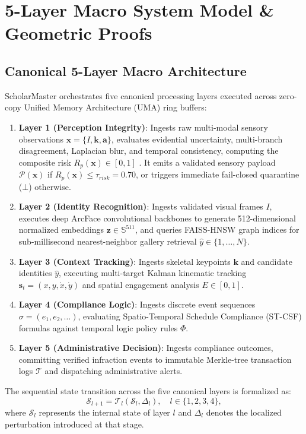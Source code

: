\documentclass[conference]{IEEEtran}
\begin{document}
\section{5-Layer Macro System Model \& Geometric Proofs}
\subsection{Canonical 5-Layer Macro Architecture}
ScholarMaster orchestrates five canonical processing layers executed across zero-copy Unified Memory Architecture (UMA) ring buffers:
\begin{enumerate}
    \item \textbf{Layer 1 (Perception Integrity)}: Ingests raw multi-modal sensory observations $\mathbf{x} = \{I, \mathbf{k}, \mathbf{a}\}$, evaluates evidential uncertainty, multi-branch disagreement, Laplacian blur, and temporal consistency, computing the composite risk $R_p(\mathbf{x}) \in [0, 1]$ \cite{kumar2026scholar22}. It emits a validated sensory payload $\mathcal{P}(\mathbf{x})$ if $R_p(\mathbf{x}) \le \tau_{risk} = 0.70$, or triggers immediate fail-closed quarantine ($\bot$) otherwise.
    \item \textbf{Layer 2 (Identity Recognition)}: Ingests validated visual frames $I$, executes deep ArcFace convolutional backbones to generate 512-dimensional normalized embeddings $\mathbf{z} \in \mathbb{S}^{511}$, and queries FAISS-HNSW graph indices for sub-millisecond nearest-neighbor gallery retrieval $\hat{y} \in \{1, \dots, N\}$.
    \item \textbf{Layer 3 (Context Tracking)}: Ingests skeletal keypoints $\mathbf{k}$ and candidate identities $\hat{y}$, executing multi-target Kalman kinematic tracking $\mathbf{s}_t = (x, y, \dot{x}, \dot{y})$ and spatial engagement analysis $E \in [0, 1]$.
    \item \textbf{Layer 4 (Compliance Logic)}: Ingests discrete event sequences $\sigma = (e_1, e_2, \dots)$, evaluating Spatio-Temporal Schedule Compliance (ST-CSF) formulas against temporal logic policy rules $\Phi$.
    \item \textbf{Layer 5 (Administrative Decision)}: Ingests compliance outcomes, committing verified infraction events to immutable Merkle-tree transaction logs $\mathcal{T}$ and dispatching administrative alerts.
\end{enumerate}

The sequential state transition across the five canonical layers is formalized as:
\begin{equation}
\mathcal{S}_{l+1} = \mathcal{T}_l(\mathcal{S}_l, \Delta_l), \quad l \in \{1, 2, 3, 4\},
\end{equation}
where $\mathcal{S}_l$ represents the internal state of layer $l$ and $\Delta_l$ denotes the localized perturbation introduced at that stage.
\end{document}
